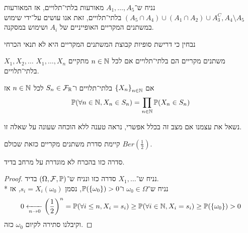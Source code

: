 \begin{example}
	נניח ש־$A_1, \dots, A_5$ מאורעות בלתי־תלויים, אז המאורעות $(A_5 \cap A_4) \cup (A_1 \cap A_2) \cup A_3^C, A_4 \setminus A_5$ בלתי־תלויים,
	זאת אנו עושים על־ידי שימוש במשתנים המקריים האופייניים של $A_i$ ושימוש במסקנה.
\end{example}
נבחין כי דרישת סופיות קבוצת המשתנים המקריים היא לא תנאי הכרחי
\begin{definition}
	$X_1, X_2, \dots$ משתנים מקריים הם בלתי־תלויים אם לכל $n \in \mathbb{N}$ מתקיים $X_1, \dots, X_n$ בלתי־תלויים.
\end{definition}
\begin{proposition}
	אם ${\{X_n\}}_{n \in \mathbb{N}}$ בלתי־תלויים ו־$S_n \in \mathcal{F}_{\mathbb{R}}$ לכל $n \in \mathbb{N}$ אז
	\[
		\mathbb{P}(\forall n \in \mathbb{N}, X_n \in S_n)
		= \prod_{n \in \mathbb{N}} \mathbb{P}(X_n \in S_n)
	\]
\end{proposition}
נשאל את עצמנו אם מצב זה בכלל אפשרי, נראה טענה ללא הוכחה שעונה על שאלה זו.
\begin{proposition}
	קיימת סדרת משתנים מקריים כזאת שכולם $Ber(\frac{1}{2})$.
\end{proposition}
\begin{proposition}
	סדרה כזו בהכרח לא מוגדרת על מרחב בדיד.
\end{proposition}
\begin{proof}
	נניח ש־$X_1, \dots$ סדרה כזו ונניח ש־$(\Omega, \mathcal{F}, \mathbb{P})$ בדיד. \\*
	נניח ש־$\omega_0 \in \Omega$ ו־$\mathbb{P}(\{\omega_0\}) > 0$, נסמן $s_i = X_i(\omega_0)$, אז
	\[
		0 \xleftarrow[n \to 0]{} {\left(\frac{1}{2}\right)}^n = \mathbb{P}(\forall i \le n, X_i = s_i) \ge \mathbb{P}(\forall i \in \mathbb{N}, X_i = s_i) \ge \mathbb{P}(\{\omega_0\}) > 0
	\]
	וקיבלנו סתירה לקיום $\omega_0$ כזה.
\end{proof}

